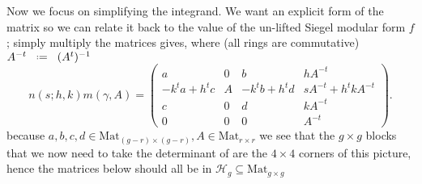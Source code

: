 Now we focus on simplifying the integrand. We want an explicit form of the matrix so we can relate it back to the value of the un-lifted Siegel modular form \(f\); simply multiply the matrices gives, where (all rings are commutative) \(A^{-t} \defeq (A^t)\inv\)
\[
		n(s; h, k) m(\gamma, A) =
		\begin{pmatrix}
			a & 0 & b & h A^{-t}\\
			-k^t a + h^t c & A & -k^t b + h^t d & s A^{-t} + h^t k A^{-t}\\
			c & 0 & d & k A^{-t}\\
			0 & 0 & 0 & A^{-t}
		\end{pmatrix}.
	\]
because \(a,b,c,d \in \mathrm{Mat}_{(g-r)\times (g-r)}, A \in \mathrm{Mat}_{r\times r}\) we see that the \(g\times g\) blocks that we now need to take the determinant of are the \(4\times 4\) corners of this picture, hence the matrices below should all be in \(\mathcal{H}_g\subseteq \mathrm{Mat}_{g\times g}\)

